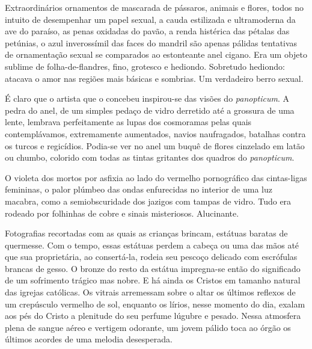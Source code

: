 
Extraordinários ornamentos de mascarada de pássaros, animais e flores, todos
no intuito de desempenhar um papel sexual, a cauda estilizada e ultramoderna
da ave do paraíso, as penas oxidadas do pavão, a renda histérica das pétalas
das petúnias, o azul inverossímil das faces do mandril são apenas pálidas
tentativas de ornamentação sexual se comparados ao estonteante anel cigano.
Era um objeto sublime de folha-de-flandres, fino, grotesco e hediondo.
Sobretudo hediondo: atacava o amor nas regiões mais básicas e sombrias. Um
verdadeiro berro sexual.

É claro que o artista que o concebeu inspirou-se das visões do \textit
{panopticum}. A pedra do anel, de um simples pedaço de vidro derretido até a
grossura de uma lente, lembrava perfeitamente as lupas dos cosmoramas pelas
quais contemplávamos, extremamente aumentados, navios naufragados, batalhas
contra os turcos e regicídios. Podia-se ver no anel um buquê de flores
cinzelado em latão ou chumbo, colorido com todas as tintas gritantes dos
quadros do \textit{panopticum}.

O violeta dos mortos por asfixia ao lado do vermelho pornográfico das
cintas-ligas femininas, o palor plúmbeo das ondas enfurecidas no interior de
uma luz macabra, como a semiobscuridade dos jazigos com tampas de vidro. Tudo
era rodeado por folhinhas de cobre e sinais misteriosos. Alucinante.


Fotografias recortadas com as quais as crianças brincam, estátuas baratas de
quermesse. Com o tempo, essas estátuas perdem a cabeça ou uma das mãos até
que sua proprietária, ao consertá-la, rodeia seu pescoço delicado com
escrófulas brancas de gesso. O bronze do resto da estátua impregna-se então
do significado de um sofrimento trágico mas nobre. E há ainda os Cristos em
tamanho natural das igrejas católicas. Os vitrais arremessam sobre o altar os
últimos reflexos de um crepúsculo vermelho de sol, enquanto os lírios, nesse
momento do dia, exalam aos pés do Cristo a plenitude do seu perfume lúgubre e
pesado. Nessa atmosfera plena de sangue aéreo e vertigem odorante, um jovem
pálido toca ao órgão os últimos acordes de uma melodia desesperada.

